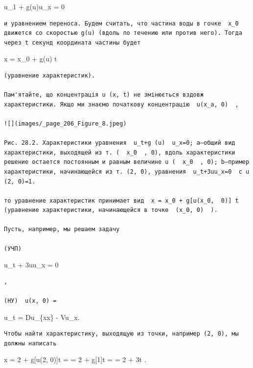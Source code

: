 \documentclass[
  ukrainian,
]{article}
\begin{document}
u\_1 + g(u)u\_x = 0

\begin{verbatim}
и уравнением переноса. Будем считать, что частина воды в гочке  x_0  движется со скоростью g(u) (вдоль по течению или против него). Тогда через t секунд координата частины будет
\end{verbatim}

x = x\_0 + g(u) t

\begin{verbatim}
(уравнение характеристик).

Пам'ятайте, що концентрація u (x, t) не змінюється вздовж характеристики. Якщо ми знаємо початкову концентрацію  u(x_a, 0)  ,

![](images/_page_206_Figure_8.jpeg)

Рис. 28.2. Характеристики уравнения  u_t+g (u)  u_x=0; a—общий вид характеристики, выходящей из т. (  x_0  , 0), вдоль характеристики решение остается постоянным и равным величине u (  x_0  , 0); b—пример характеристики, начинающейся из т. (2, 0), уравнения  u_t+3uu_x=0  с u (2, 0)=1.

то уравнение характеристик принимает вид  x = x_0 + g[u(x_0,  0)] t  (уравнение характеристики, начинающейся в точке  (x_0, 0)  ).

Пусть, например, мы решаем задачу

(УЧП)
\end{verbatim}

u\_t + 3uu\_x = 0

\begin{verbatim}
,

(НУ)  u(x, 0) =
\end{verbatim}

u\_t = Du\_\{xx\} - Vu\_x.

\begin{verbatim}
Чтобы найти характеристику, выходящую из точки, например (2, 0), мы должны написать
\end{verbatim}

x = 2 + g{[}u(2, 0){]}t = = 2 + g{[}1{]}t = = 2 + 3t .
\end{document}
